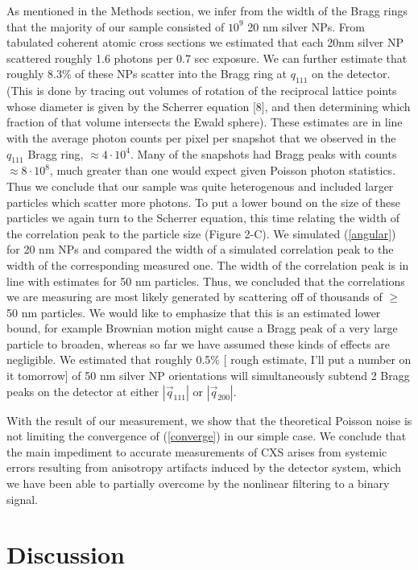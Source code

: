 \documentclass [11pt,fleqn]{article}
\begin{document}
As mentioned in the Methods section, we infer from the width of the Bragg rings that the majority of our sample consisted of $10^9$ 20 nm silver NPs. From tabulated coherent atomic cross sections \cite{Henke:1993wx} we estimated that each 20nm silver NP scattered roughly 1.6 photons per 0.7 sec exposure. We can further estimate that roughly 8.3\% of these NPs scatter into the Bragg ring at $q_{111}$ on the detector. (This is done by tracing out volumes of rotation of the reciprocal lattice points whose diameter is given by the Scherrer equation [8], and then determining which fraction of that volume intersects the Ewald sphere). These estimates are in line with the average photon counts per pixel per snapshot that we observed in the $q_{111}$ Bragg ring, $\approx 4 \cdot10^4$. Many of the snapshots had Bragg peaks with counts $\approx 8 \cdot10^8$, much greater than one would expect given Poisson photon statistics. Thus we conclude that our sample was quite heterogenous and included larger particles which scatter more photons. To put a lower bound on the size of these particles we again turn to the Scherrer equation, this time relating the width of the correlation peak to the particle size (Figure 2-C). We simulated (\ref{angular}) for 20 nm NPs and compared the width of a simulated correlation peak to the width of the corresponding measured one. The width of the correlation peak is in line with estimates for 50 nm particles. Thus, we concluded that the correlations we are measuring are most likely generated by scattering off of thousands of $\ge$50 nm particles. We would like to emphasize that this is an estimated lower bound, for example Brownian motion might cause a Bragg peak of a very large particle to broaden, whereas so far we have assumed these kinds of effects are negligible. We estimated that roughly 0.5\% [ rough estimate, I'll put a number on it tomorrow] of 50 nm silver NP orientations will simultaneously subtend 2 Bragg peaks on the detector at either $|\vec{q}_{111}|$ or $|\vec{q}_{200}|$.

With the result of our measurement, we show that the theoretical Poisson noise is not limiting the convergence of (\ref{converge}) in our simple case. We conclude that the main impediment to accurate measurements of CXS arises from systemic errors resulting from anisotropy artifacts induced by the detector system, which we have been able to partially overcome by the nonlinear filtering to a binary signal.

\section{Discussion}
\end{document}
